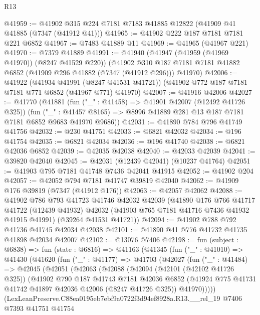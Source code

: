 \begin{lexlean}{R13}
\begin{coremodule}
@41959 := @41902 @315 @224 @7181 @7183 @41885 @12822 (@41909 @41 @41885 (@7347 (@41912 @41)))
@41965 := @41902 @222 @187 @7181 @7181 @221 @6852
@41967 := @7483 @41889 @11
@41969 := @41965 (@41967 @221)
@41970 := @7379 @41889
@41991 := @41940
    (@41947 (@41959 (@41969 @41970)) (@8247 @41529 @220))
    (@41902 @310 @187 @7181 @7181 @41882 @6852 (@41909 @296 @41882 (@7347 (@41912 @296))) @41970)
@42006 := @41922
    (@41934 @41991 (@8247 @41531 @41721))
    (@41902 @772 @187 @7181 @7181 @771 @6852 (@41967 @771) @41970)
@42007 := @41916 @42006
@42027 := @41770
    (@41881
      (fun ("_" : @41458) => @41901 @42007 (@12492 @41726 @325))
      (fun ("_" : @41457 @8165) => @8996 @41889 @281 @13 @187 @7181 @7181 @6852 @9683 @41970 @9686))
@42031 := @41890 @784 @796 @41749 @41756
@42032 := @230 @41751
@42033 := @6821 @42032
@42034 := @196 @41754
@42035 := @6821 @42034
@42036 := @196 @41740
@42038 := @6821 @42036 @6852
@42039 := @42035 @42038
@42040 := @42033 @42039
@42041 := @39820 @42040
@42045 := @42031 (@12439 @42041) (@10237 @41764)
@42051 := @41903 @795 @7181 @41748 @7436 @42041 @41915
@42052 := @41902 @204
@42057 := @42052 @794 @7181 @41747 @39819 @42040
@42062 := @41909 @176 @39819 (@7347 (@41912 @176))
@42063 := @42057 @42062
@42088 := @41902
    @786
    @793
    @41723
    @41746
    @42032
    @42039
    (@41890
      @176
      @766
      @41717
      @41722
      (@12439 @41932)
      @42032
      (@41903 @765 @7181 @41716 @7436 @41932 @41915 @41991)
      (@39264 @41531 @41721))
@42094 := @41902 @788 @792 @41736 @41745 @42034 @42038
@42101 := @41890 @41 @776 @41732 @41735 @41898 @42034 @42007
@42102 := @13076 @7406
@42198 := fun (subject : @6838) =>
  fun (state : @6816) =>
  @41163
    (@41345
      (fun ("_" : @41010) =>
      @41430
        (@41620
          (fun ("_" : @41177) =>
          @41703
            (@42027
              (fun ("_" : @41484) =>
              @42045
                (@42051
                  (@42063
                    (@42088
                      (@42094
                        (@42101 (@42102 @41726 @325))
                        (@41902
                          @790
                          @187
                          @41743
                          @7181
                          @42036
                          @6852
                          (@41924 @775 @41731 @41742 @41897 @42036 @42006 (@8247 @41726 @325))
                          @41970)))))
                (LexLeanPreserve.C88ea0195eb7ebf9a0722f3d94ef8928a.R13.__rel_19
                  @7406
                  @7393
                  @41751
                  @41754

\end{coremodule}
\end{lexlean}
